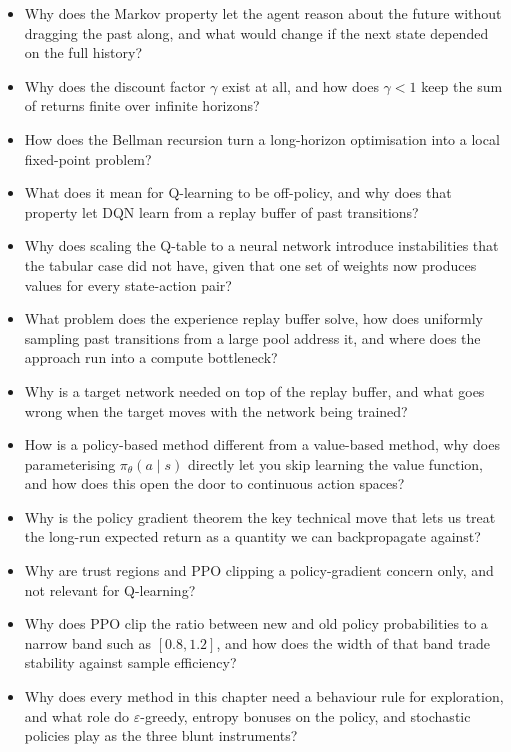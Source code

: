 \begin{itemize}
    \item Why does the Markov property let the agent reason about the future without dragging the past along, and what would change if the next state depended on the full history?
    \item Why does the discount factor $\gamma$ exist at all, and how does $\gamma < 1$ keep the sum of returns finite over infinite horizons?
    \item How does the Bellman recursion turn a long-horizon optimisation into a local fixed-point problem?
    \item What does it mean for Q-learning to be off-policy, and why does that property let DQN learn from a replay buffer of past transitions?
    \item Why does scaling the Q-table to a neural network introduce instabilities that the tabular case did not have, given that one set of weights now produces values for every state-action pair?
    \item What problem does the experience replay buffer solve, how does uniformly sampling past transitions from a large pool address it, and where does the approach run into a compute bottleneck?
    \item Why is a target network needed on top of the replay buffer, and what goes wrong when the target moves with the network being trained?
    \item How is a policy-based method different from a value-based method, why does parameterising $\pi_\theta(a \mid s)$ directly let you skip learning the value function, and how does this open the door to continuous action spaces?
    \item Why is the policy gradient theorem the key technical move that lets us treat the long-run expected return as a quantity we can backpropagate against?
    \item Why are trust regions and PPO clipping a policy-gradient concern only, and not relevant for Q-learning?
    \item Why does PPO clip the ratio between new and old policy probabilities to a narrow band such as $[0.8, 1.2]$, and how does the width of that band trade stability against sample efficiency?
    \item Why does every method in this chapter need a behaviour rule for exploration, and what role do $\varepsilon$-greedy, entropy bonuses on the policy, and stochastic policies play as the three blunt instruments?
\end{itemize}

